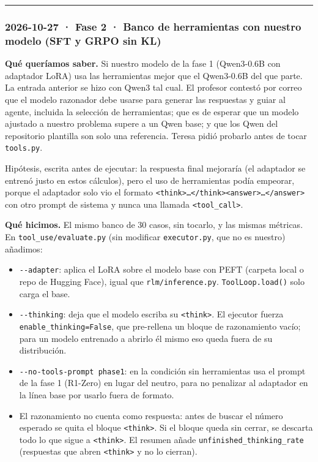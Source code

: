 \begin{center}\rule{0.5\linewidth}{0.5pt}\end{center}

\subsubsection{2026-10-27 · Fase 2 · Banco de herramientas con nuestro modelo (SFT y GRPO sin KL)}

\textbf{Qué queríamos saber.} Si nuestro modelo de la fase 1 (Qwen3-0.6B con adaptador LoRA) usa las
herramientas mejor que el Qwen3-0.6B del que parte. La entrada anterior se hizo con Qwen3 tal
cual. El profesor contestó por correo que el modelo razonador debe usarse para generar las
respuestas y guiar al agente, incluida la selección de herramientas; que es de esperar que un
modelo ajustado a nuestro problema supere a un Qwen base; y que los Qwen del repositorio plantilla
son solo una referencia. Teresa pidió probarlo antes de tocar \texttt{tools.py}.

Hipótesis, escrita antes de ejecutar: la respuesta final mejoraría (el adaptador se entrenó
justo en estos cálculos), pero el uso de herramientas podía empeorar, porque el adaptador solo
vio el formato \texttt{\textless{}think\textgreater{}…\textless{}/\allowbreak{}think\textgreater{}\textless{}answer\textgreater{}…\textless{}/\allowbreak{}answer\textgreater{}} con otro prompt de sistema y nunca una
llamada \texttt{\textless{}tool\_\allowbreak{}call\textgreater{}}.

\textbf{Qué hicimos.} El mismo banco de 30 casos, sin tocarlo, y las mismas métricas. En
\texttt{tool\_\allowbreak{}use/\allowbreak{}evaluate.py} (sin modificar \texttt{executor.py}, que no es nuestro) añadimos:

\begin{itemize}
\tightlist
\item
  \texttt{-\/\allowbreak{}-adapter}: aplica el LoRA sobre el modelo base con PEFT (carpeta local o repo de Hugging
  Face), igual que \texttt{rlm/\allowbreak{}inference.py}. \texttt{ToolLoop.load()} solo carga el base.
\item
  \texttt{-\/\allowbreak{}-thinking}: deja que el modelo escriba su \texttt{\textless{}think\textgreater{}}. El ejecutor fuerza
  \texttt{enable\_\allowbreak{}thinking=\allowbreak{}False}, que pre-rellena un bloque de razonamiento vacío; para un modelo
  entrenado a abrirlo él mismo eso queda fuera de su distribución.
\item
  \texttt{-\/\allowbreak{}-no-tools-prompt phase1}: en la condición sin herramientas usa el prompt de la fase 1 (R1-Zero)
  en lugar del neutro, para no penalizar al adaptador en la línea base por usarlo fuera de formato.
\item
  El razonamiento no cuenta como respuesta: antes de buscar el número esperado se quita el bloque
  \texttt{\textless{}think\textgreater{}}. Si el bloque queda sin cerrar, se descarta todo lo que sigue a \texttt{\textless{}think\textgreater{}}. El resumen
  añade \texttt{unfinished\_\allowbreak{}thinking\_\allowbreak{}rate} (respuestas que abren \texttt{\textless{}think\textgreater{}} y no lo cierran).
\end{itemize}


